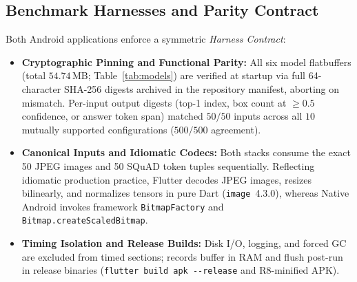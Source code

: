 \subsection{Benchmark Harnesses and Parity Contract}
Both Android applications enforce a symmetric \textit{Harness Contract}:
\begin{itemize}
    \item \textbf{Cryptographic Pinning and Functional Parity:} All six model flatbuffers (total $54.74$\,MB; Table~\ref{tab:models}) are verified at startup via full 64-character SHA-256 digests archived in the repository manifest, aborting on mismatch. Per-input output digests (top-1 index, box count at $\ge 0.5$ confidence, or answer token span) matched $50/50$ inputs across all $10$ mutually supported configurations ($500/500$ agreement).
    \item \textbf{Canonical Inputs and Idiomatic Codecs:} Both stacks consume the exact 50 JPEG images and 50 SQuAD token tuples sequentially. Reflecting idiomatic production practice, Flutter decodes JPEG images, resizes bilinearly, and normalizes tensors in pure Dart (\texttt{image}~4.3.0), whereas Native Android invokes framework \texttt{BitmapFactory} and \texttt{Bitmap.createScaledBitmap}.
    \item \textbf{Timing Isolation and Release Builds:} Disk I/O, logging, and forced GC are excluded from timed sections; records buffer in RAM and flush post-run in release binaries (\texttt{flutter build apk -{}-release} and R8-minified APK).
\end{itemize}

\begin{table}[t]
\caption{Model Specifications (8-Char SHA-256 Prefixes; Full Digests in Repo)}
\label{tab:models}
\centering
{}
\end{table}

